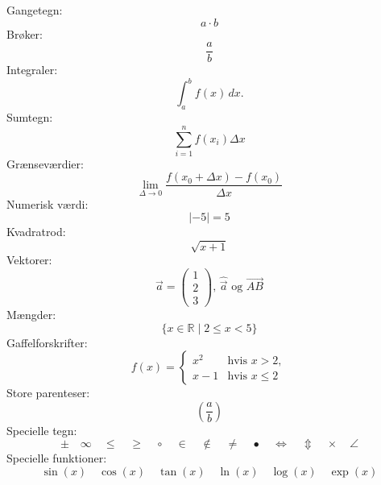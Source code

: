\documentclass[a4paper,12pt,oneside,article]{memoir}
\newcommand{\R}{\mathbb{R}} %
\begin{document}
Gangetegn:
\begin{equation*}%
	a\cdot b
\end{equation*}
Brøker:
\begin{equation*}
	\frac{a}{b}
\end{equation*}
Integraler:
\begin{equation*}
	\int_a^b f(x)\, dx. %
\end{equation*}
Sumtegn:
\begin{equation*}
	\sum_{i=1}^n f(x_i) \Delta x
\end{equation*}
Grænseværdier:
\begin{equation*}
	\lim_{\Delta \to 0} \frac{f(x_0+\Delta x)-f(x_0)}{\Delta x}
\end{equation*}
Numerisk værdi:
\begin{equation*}
	\lvert -5 \rvert=5
\end{equation*}
Kvadratrod:
\begin{equation*}
	\sqrt{x+1}
\end{equation*}
Vektorer:
\begin{equation*}
	\vec{a} =\begin{pmatrix} 1\\2\\3 \end{pmatrix} \text{, } \widehat{\vec{a}} \text{ og } \overrightarrow{AB}
\end{equation*}
Mængder:
\begin{equation*}
	\{x \in \R \mid 2\leq x<5\} 
\end{equation*}
Gaffelforskrifter:
\begin{equation*}
	f(x) = \begin{cases}
	x^2 & \text{hvis } x>2,\\
	x-1 & \text{hvis } x\leq 2
	\end{cases}
\end{equation*}
Store parenteser:
\begin{equation*}
	\left(\frac{a}{b} \right)
\end{equation*}
Specielle tegn:
\begin{equation*}
	\pm \quad \infty \quad \leq \quad \geq \quad \circ \quad \in \quad \notin \quad \neq \quad \bullet \quad \Leftrightarrow \quad \Updownarrow \quad \times \quad \angle
\end{equation*}
Specielle funktioner:
\begin{equation*}
	\sin(x) \quad \cos(x) \quad \tan(x) \quad \ln(x) \quad \log(x) \quad \exp(x)
\end{equation*}
\end{document}
